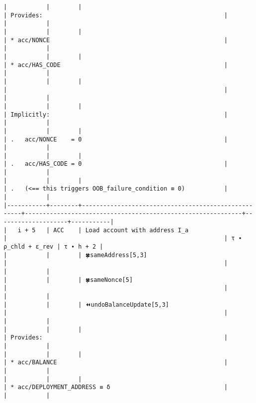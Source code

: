 \documentclass[varwidth=\maxdimen,margin=0.5cm,multi={verbatim}]{standalone}
\begin{document}
\begin{verbatim}
|           |        |                                                     | Provides:                                                   |                    |           |
|           |        |                                                     | * acc/NONCE                                                 |                    |           |
|           |        |                                                     | * acc/HAS_CODE                                              |                    |           |
|           |        |                                                     |                                                             |                    |           |
|           |        |                                                     | Implicitly:                                                 |                    |           |
|           |        |                                                     | .   acc/NONCE    = 0                                        |                    |           |
|           |        |                                                     | .   acc/HAS_CODE = 0                                        |                    |           |
|           |        |                                                     | .   (<== this triggers OOB_failure_condition ≡ 0)           |                    |           |
|-----------+--------+-----------------------------------------------------+-------------------------------------------------------------+--------------------+-----------|
|   i + 5   | ACC    | Load account with address I_a                       |                                                             | τ ∙ ρ_chld + ε_rev | τ ∙ h + 2 |
|           |        | 🍀sameAddress[5,3]                                  |                                                             |                    |           |
|           |        | 🍀sameNonce[5]                                      |                                                             |                    |           |
|           |        | ⏪undoBalanceUpdate[5,3]                            |                                                             |                    |           |
|           |        |                                                     | Provides:                                                   |                    |           |
|           |        |                                                     | * acc/BALANCE                                               |                    |           |
|           |        |                                                     | * acc/DEPLOYMENT_ADDRESS ≡ δ                                |                    |           |

\end{verbatim}
\end{document}
